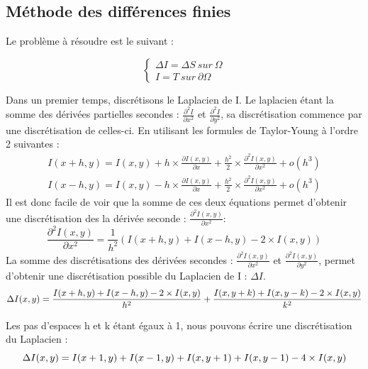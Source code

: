 \subsection{Méthode des différences finies}
Le problème à résoudre est le suivant : 
\begin{center}

\begin{equation*}
    \left \{
    \begin{aligned}
    \Delta I = \Delta S \ sur \ \Omega\\
    I = T \ sur \ \partial \Omega
    \end{aligned}
    \right.
\end{equation*}
\end{center}
Dans un premier temps, discrétisons le Laplacien de I. Le laplacien étant la somme des dérivées partielles secondes : $\frac{\partial^2 I}{\partial x^2}$ et  $\frac{\partial^2 I}{\partial y^2}$, sa discrétisation commence par une discrétisation de celles-ci. En utilisant les formules de Taylor-Young à l'ordre 2 suivantes :
\begin{equation*}
\begin{aligned}
    I(x+h,y) = I(x,y)+h\times \frac{\partial I(x,y)}{\partial x}+ \frac{h^2}{2} \times \frac{\partial ^2 I(x,y)}{\partial x^2} + o(h^3) \\
    I(x-h,y) =I(x,y)- h\times  \frac{\partial I(x,y)}{\partial x}+ \frac{h^2}{2} \times \frac{\partial^2 I(x,y)}{\partial x^2} + o(h^3)
\end{aligned}
\end{equation*}
Il est donc facile de voir que la somme de ces deux équations permet d'obtenir une discrétisation des la dérivée seconde : $\frac{\partial ^2 I(x,y)}{\partial x^2}$:  
\begin{equation*}
    \frac{\partial ^2 I(x,y)}{\partial x^2} =\frac{1}{h^2}\left( I(x+h,y) + I(x-h,y) - 2\times I(x,y)\right)
\end{equation*}
La somme des discrétisations des dérivées secondes : $\frac{\partial ^2 I(x,y)}{\partial x^2}$ et $\frac{\partial ^2 I(x,y)}{\partial y^2}$, permet d'obtenir une discrétisation possible du Laplacien de I : $\Delta I$.
\begin{equation*}
    \Delta I(x,y) =  \frac{I(x+h,y) + I(x-h,y) - 2\times I(x,y)}{h^2}  + \frac{I(x,y+k) + I(x,y-k) - 2\times I(x,y)}{k^2} \\
\end{equation*}

Les pas d'espaces h et k étant égaux à 1, nous pouvons écrire une discrétisation du Laplacien  :
\begin{equation*}
     \Delta I(x,y) =  I(x+1,y) + I(x-1,y)+ I(x,y+1) + I(x,y-1) - 4\times I(x,y)  \\
\end{equation*}

